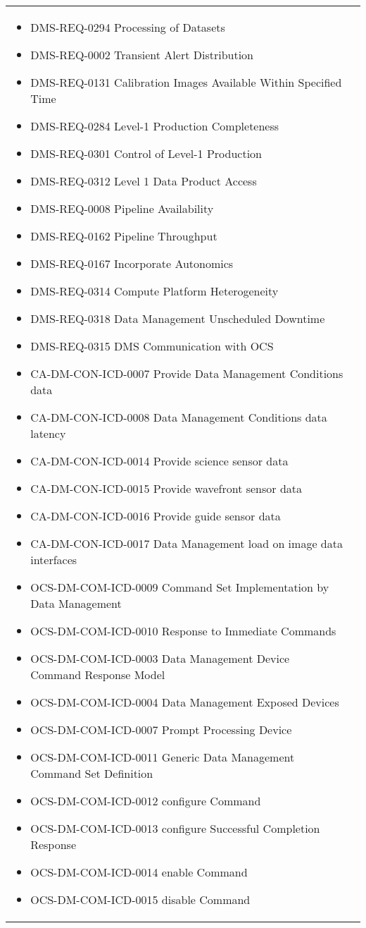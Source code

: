 \begin{xtabular}{lp{0.7\textwidth}}
\begin{itemize}
\item DMS-REQ-0294 Processing of Datasets
\item DMS-REQ-0002 Transient Alert Distribution
\item DMS-REQ-0131 Calibration Images Available Within Specified Time
\item DMS-REQ-0284 Level-1 Production Completeness
\item DMS-REQ-0301 Control of Level-1 Production
\item DMS-REQ-0312 Level 1 Data Product Access
\item DMS-REQ-0008 Pipeline Availability
\item DMS-REQ-0162 Pipeline Throughput
\item DMS-REQ-0167 Incorporate Autonomics
\item DMS-REQ-0314 Compute Platform Heterogeneity
\item DMS-REQ-0318 Data Management Unscheduled Downtime
\item DMS-REQ-0315 DMS Communication with OCS
\item CA-DM-CON-ICD-0007 Provide Data Management Conditions data
\item CA-DM-CON-ICD-0008 Data Management Conditions data latency
\item CA-DM-CON-ICD-0014 Provide science sensor data
\item CA-DM-CON-ICD-0015 Provide wavefront sensor data
\item CA-DM-CON-ICD-0016 Provide guide sensor data
\item CA-DM-CON-ICD-0017 Data Management load on image data interfaces
\item OCS-DM-COM-ICD-0009 Command Set Implementation by Data Management
\item OCS-DM-COM-ICD-0010 Response to Immediate Commands
\item OCS-DM-COM-ICD-0003 Data Management Device Command Response Model
\item OCS-DM-COM-ICD-0004 Data Management Exposed Devices
\item OCS-DM-COM-ICD-0007 Prompt Processing Device
\item OCS-DM-COM-ICD-0011 Generic Data Management Command Set Definition
\item OCS-DM-COM-ICD-0012 configure Command
\item OCS-DM-COM-ICD-0013 configure Successful Completion Response
\item OCS-DM-COM-ICD-0014 enable Command
\item OCS-DM-COM-ICD-0015 disable Command

\end{itemize}
\end{xtabular}
